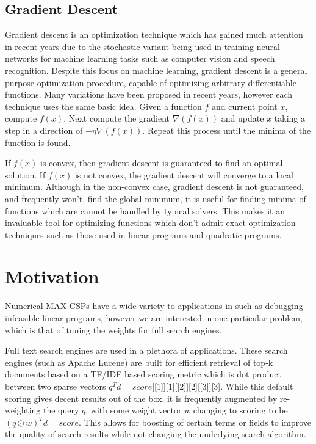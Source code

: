 \documentclass[a4paper]{article}
\begin{document}
\subsection{Gradient Descent}

Gradient descent is an optimization technique which has gained much 
attention in recent years due to the stochastic variant being used in training neural networks for machine learning 
tasks such as computer vision and speech recognition. Despite this focus on machine learning,
gradient descent is a general purpose optimization procedure, capable of optimizing arbitrary 
differentiable functions. Many variations have been proposed in recent years, however
each technique uses the same basic idea. Given a function $f$ and current point $x$, compute $f(x)$. 
Next compute the gradient $\nabla(f(x))$ and update $x$ taking a step in a direction of $-\eta \nabla(f(x))$. Repeat this 
process until the minima of the function is found. 

If $f(x)$ is convex, then gradient descent is guaranteed to find an optimal solution. If $f(x)$ is not convex, 
the gradient descent will converge to a local minimum. Although in the non-convex case, gradient descent 
is not guaranteed, and frequently won't, find the global minimum, it is useful for finding 
minima of functions which are cannot be handled by typical solvers.  This makes it an invaluable tool for 
optimizing functions which don't admit exact optimization techniques such as those used in 
linear programs and quadratic programs.

\section{Motivation}

Numerical MAX-CSPs have a wide variety to applications in such as debugging infeasible 
linear programs, however we are interested in one particular problem, which is that of 
tuning the weights for full search engines. 

Full text search engines are used in a plethora of applications. These search engines (such as Apache Lucene)
are built for efficient retrieval of top-k documents based on a TF/IDF based scoring metric which is dot 
product between two sparse vectors $q^Td = score$[[1]][1][[2]][2][[3]][3]. While this default scoring gives decent results out of the box, 
it is frequently augmented by re-weighting the query $q$, with some weight vector $w$
changing to scoring to be $(q\odot w)^Td = score$. This allows for boosting of certain terms or fields
to improve the quality of search results while not changing the underlying search algorithm. 
\end{document}
